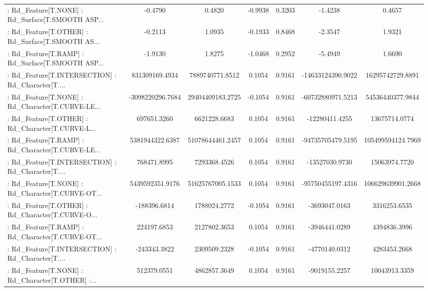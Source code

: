 \begin{longtable}{p{4cm}cccccc}
 : Rd\_Feature[T.NONE] : Rd\_Surface[T.SMOOTH ASP... &           -0.4790 &            0.4820 & -0.9938 &       0.3203 &            -1.4238 &            0.4657 \\
 : Rd\_Feature[T.OTHER] : Rd\_Surface[T.SMOOTH AS... &           -0.2113 &            1.0935 & -0.1933 &       0.8468 &            -2.3547 &            1.9321 \\
 : Rd\_Feature[T.RAMP] : Rd\_Surface[T.SMOOTH ASP... &           -1.9130 &            1.8275 & -1.0468 &       0.2952 &            -5.4949 &            1.6690 \\
 : Rd\_Feature[T.INTERSECTION] : Rd\_Character[T.... &    831309169.4934 &   7889740771.8512 &  0.1054 &       0.9161 &  -14633124390.9022 &  16295742729.8891 \\
 : Rd\_Feature[T.NONE] : Rd\_Character[T.CURVE-LE... &  -3098220296.7684 &  29404409183.2725 & -0.1054 &       0.9161 &  -60732880971.5213 &  54536440377.9844 \\
 : Rd\_Feature[T.OTHER] : Rd\_Character[T.CURVE-L... &       697651.3260 &      6621228.6683 &  0.1054 &       0.9161 &     -12280411.4255 &     13675714.0774 \\
 : Rd\_Feature[T.RAMP] : Rd\_Character[T.CURVE-LE... &   5381944322.6387 &  51078644461.2457 &  0.1054 &       0.9161 &  -94735705479.5195 & 105499594124.7969 \\
 : Rd\_Feature[T.INTERSECTION] : Rd\_Character[T.... &       768471.8995 &      7293368.4526 &  0.1054 &       0.9161 &     -13527030.9730 &     15063974.7720 \\
 : Rd\_Feature[T.NONE] : Rd\_Character[T.CURVE-OT... &   5439592351.9176 &  51625767005.1533 &  0.1054 &       0.9161 &  -95750455197.4316 & 106629639901.2668 \\
 : Rd\_Feature[T.OTHER] : Rd\_Character[T.CURVE-O... &      -188396.6814 &      1788024.2772 & -0.1054 &       0.9161 &      -3693047.0163 &      3316253.6535 \\
 : Rd\_Feature[T.RAMP] : Rd\_Character[T.CURVE-OT... &       224197.6853 &      2127802.3653 &  0.1054 &       0.9161 &      -3946441.0289 &      4394836.3996 \\
 : Rd\_Feature[T.INTERSECTION] : Rd\_Character[T.... &      -243343.3822 &      2309509.2328 & -0.1054 &       0.9161 &      -4770140.0312 &      4283453.2668 \\
 : Rd\_Feature[T.NONE] : Rd\_Character[T.OTHER] :... &       512379.0551 &      4862857.3649 &  0.1054 &       0.9161 &      -9019155.2257 &     10043913.3359 \\

\end{longtable}

